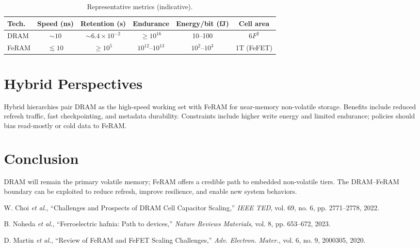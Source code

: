 \documentclass[journal]{IEEEtran}
\begin{document}
\begin{table}[!t]
\caption{Representative metrics (indicative).}
\label{tab:comparison}
\centering
\begin{tabular}{@{}lccccc@{}}
\toprule
Tech. & Speed (ns) & Retention (s) & Endurance & Energy/bit (fJ) & Cell area \\
\midrule
DRAM  & $\sim 10$ & $\sim 6.4\times 10^{-2}$ & $\ge 10^{16}$ & 10--100    & $6F^2$ \\
FeRAM & $\lesssim 10$ & $\ge 10^{5}$           & $10^{12}$--$10^{13}$ & $10^{2}$--$10^{3}$ & 1T (FeFET) \\
\bottomrule
\end{tabular}
\end{table}

\section{Hybrid Perspectives}
Hybrid hierarchies pair DRAM as the high-speed working set with FeRAM for near-memory non-volatile storage. Benefits include reduced refresh traffic, fast checkpointing, and metadata durability. Constraints include higher write energy and limited endurance; policies should bias read-mostly or cold data to FeRAM.

\section{Conclusion}
DRAM will remain the primary volatile memory; FeRAM offers a credible path to embedded non-volatile tiers. The DRAM--FeRAM boundary can be exploited to reduce refresh, improve resilience, and enable new system behaviors.

\begin{thebibliography}{9}
W. Choi \textit{et al.}, ``Challenges and Prospects of DRAM Cell Capacitor Scaling,'' \textit{IEEE TED}, vol. 69, no. 6, pp. 2771--2778, 2022.

B. Noheda \textit{et al.}, ``Ferroelectric hafnia: Path to devices,'' \textit{Nature Reviews Materials}, vol. 8, pp. 653--672, 2023.

D. Martin \textit{et al.}, ``Review of FeRAM and FeFET Scaling Challenges,'' \textit{Adv. Electron. Mater.}, vol. 6, no. 9, 2000305, 2020.
\end{thebibliography}
\end{document}
